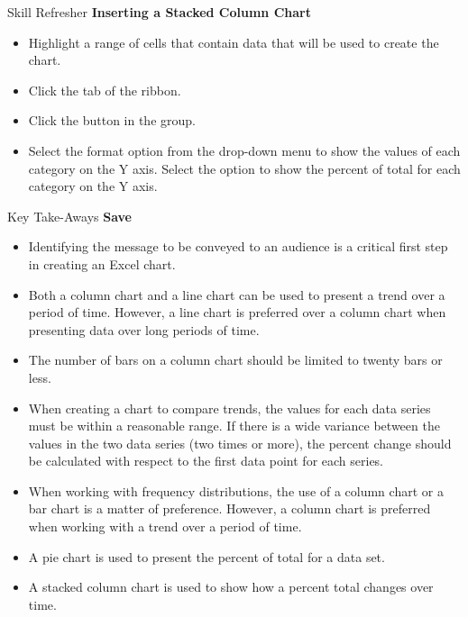 \begin{center}
	\begin{sklbox}{Skill Refresher}
		\textbf{Inserting a Stacked Column Chart}
		\\
		\begin{itemize}
			\setlength{\itemsep}{0pt}
			\setlength{\parskip}{0pt}
			\setlength{\parsep}{0pt}

			\item Highlight a range of cells that contain data that will be used to create the chart.
			\item Click the  tab of the ribbon.
			\item Click the  button in the  group.
			\item Select the  format option from the  drop-down menu to show the values of each category on the Y axis. Select the  option to show the percent of total for each category on the Y axis.
			
		\end{itemize}
	\end{sklbox}
\end{center}

\begin{center}
	\begin{tkwbox}{Key Take-Aways}
		\textbf{Save}
		\\
		\begin{itemize}
			\setlength{\itemsep}{0pt}
			\setlength{\parskip}{0pt}
			\setlength{\parsep}{0pt}
			
			\item Identifying the message to be conveyed to an audience is a critical first step in creating an Excel chart.
			\item Both a column chart and a line chart can be used to present a trend over a period of time. However, a line chart is preferred over a column chart when presenting data over long periods of time.
			\item The number of bars on a column chart should be limited to twenty bars or less.
			\item When creating a chart to compare trends, the values for each data series must be within a reasonable range. If there is a wide variance between the values in the two data series (two times or more), the percent change should be calculated with respect to the first data point for each series.
			\item When working with frequency distributions, the use of a column chart or a bar chart is a matter of preference. However, a column chart is preferred when working with a trend over a period of time.
			\item A pie chart is used to present the percent of total for a data set.
			\item A stacked column chart is used to show how a percent total changes over time.

		\end{itemize}
	\end{tkwbox}
\end{center}

